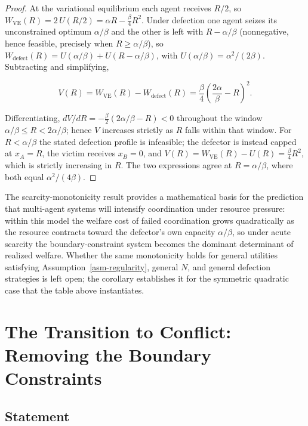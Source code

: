 \documentclass[11pt]{article}
\theoremstyle{plain}
\theoremstyle{definition}
\theoremstyle{remark}
\let\origsection\section
\renewcommand{\section}{\needspace{12\baselineskip}\origsection}
\let\origsubsection\subsection
\renewcommand{\subsection}{\needspace{7\baselineskip}\origsubsection}
\begin{document}
\begin{proof}
At the variational equilibrium each agent receives $R/2$, so $W_{\text{VE}}(R) = 2\,U(R/2) = \alpha R - \tfrac{\beta}{4} R^2$. Under defection one agent seizes its unconstrained optimum $\alpha/\beta$ and the other is left with $R - \alpha/\beta$ (nonnegative, hence feasible, precisely when $R \geq \alpha/\beta$), so $W_{\text{defect}}(R) = U(\alpha/\beta) + U(R - \alpha/\beta)$, with $U(\alpha/\beta) = \alpha^2/(2\beta)$. Subtracting and simplifying,

$$V(R) = W_{\text{VE}}(R) - W_{\text{defect}}(R) = \frac{\beta}{4}\left(\frac{2\alpha}{\beta} - R\right)^2.$$

Differentiating, $dV/dR = -\tfrac{\beta}{2}\left(2\alpha/\beta - R\right) < 0$ throughout the window $\alpha/\beta \leq R < 2\alpha/\beta$; hence $V$ increases strictly as $R$ falls within that window. For $R < \alpha/\beta$ the stated defection profile is infeasible; the defector is instead capped at $x_A = R$, the victim receives $x_B = 0$, and $V(R) = W_{\text{VE}}(R) - U(R) = \frac{\beta}{4} R^2$, which is strictly increasing in $R$. The two expressions agree at $R = \alpha/\beta$, where both equal $\alpha^2/(4\beta)$.
\end{proof}

The scarcity-monotonicity result provides a mathematical basis for the
prediction that multi-agent systems will intensify coordination under
resource pressure: within this model the welfare cost of failed
coordination grows quadratically as the resource contracts toward the
defector's own capacity \(\alpha/\beta\), so under acute scarcity the
boundary-constraint system becomes the dominant determinant of realized
welfare. Whether the same monotonicity holds for general utilities
satisfying Assumption~\ref{asm-regularity}, general \(N\), and general
defection strategies is left open; the corollary establishes it for the
symmetric quadratic case that the table above instantiates.

\section{The Transition to Conflict: Removing the Boundary
Constraints}\label{the-transition-to-conflict-removing-the-boundary-constraints}

\subsection{Statement}\label{statement}
\end{document}
